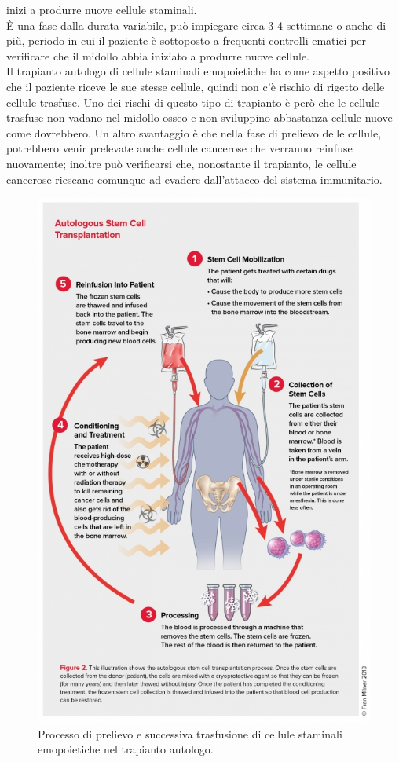 inizi a produrre nuove cellule staminali\cite{TRAPIANTO}.\\
È una fase dalla durata variabile, può impiegare circa 3-4 settimane o anche di più, periodo in cui il paziente 
è sottoposto a frequenti controlli ematici per verificare che il midollo abbia iniziato a produrre nuove cellule\cite{LLSBLOOD}.\\
Il trapianto autologo di cellule staminali emopoietiche ha come aspetto positivo che il paziente riceve le sue stesse cellule, quindi non c’è rischio di rigetto delle cellule trasfuse. 
Uno dei rischi di questo tipo di trapianto è però che le cellule trasfuse non vadano nel midollo osseo e non 
sviluppino abbastanza cellule nuove come dovrebbero. Un altro svantaggio è che nella fase di prelievo delle cellule, 
potrebbero venir prelevate anche cellule cancerose che verranno reinfuse nuovamente; inoltre  può verificarsi che, 
nonostante il trapianto, le cellule cancerose riescano comunque ad evadere dall’attacco del sistema immunitario\cite{STEMCELLS}.\\

\begin{figure}[H]
    \begin{center}
    \includegraphics[width=0.8\columnwidth]{img/AUTOLOGO.jpeg}
    \end{center}
    \caption[Processo di prelievo e successiva trasfusione di cellule staminali emopoietiche nel trapianto autologo.]{Processo di prelievo e successiva trasfusione di cellule staminali emopoietiche nel trapianto autologo.
    \cite{img36}}

\end{figure}

